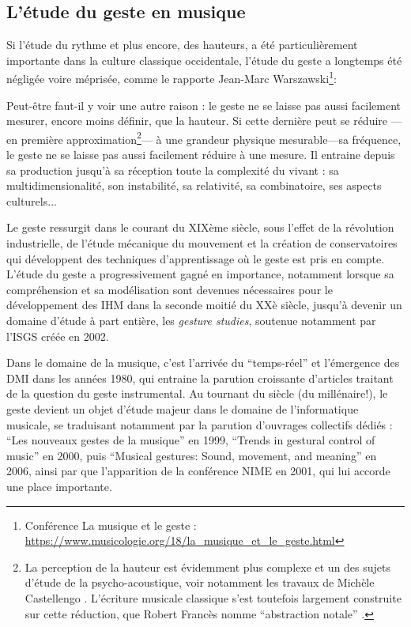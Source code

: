 \subsection{L'étude du geste en musique}

\noindent Si l'étude du rythme et plus encore, des hauteurs, a été particulièrement importante dans la culture classique occidentale, l'étude du geste a longtemps été négligée voire méprisée, comme le rapporte Jean-Marc Warszawski\footnote{Conférence La musique et le geste : \url{https://www.musicologie.org/18/la_musique_et_le_geste.html}}:


Peut-être faut-il y voir une autre raison : le geste ne se laisse pas aussi facilement mesurer, encore moins définir, que la hauteur. Si cette dernière peut se  réduire —en première approximation\footnote{La perception de la hauteur est évidemment plus complexe et un des sujets d'étude de la psycho-acoustique, voir notamment les travaux de Michèle Castellengo \cite{castellengo_ecoute_2015}. L'écriture musicale classique s'est toutefois largement construite sur cette réduction, que Robert Francès nomme ``abstraction notale'' \cite{frances_perception_1984}.}— à une grandeur physique mesurable—sa fréquence, le geste ne se laisse pas aussi facilement réduire à une mesure. Il entraine depuis sa production jusqu'à sa réception toute la complexité du vivant : sa multidimensionalité, son instabilité, sa relativité, sa combinatoire, ses aspects culturels...

Le geste ressurgit dans le courant du XIXème siècle, sous l'effet de la révolution industrielle, de l'étude mécanique du mouvement et la création de conservatoires qui développent des techniques d'apprentissage où le geste est pris en compte. L'étude du geste a progressivement gagné en importance, notamment lorsque sa compréhension et sa modélisation sont devenues nécessaires pour le développement des \gls{IHM} dans la seconde moitié du XXè siècle, jusqu'à devenir un domaine d'étude à part entière, les \textit{gesture studies}, soutenue notamment par l'\gls{ISGS} créée en 2002.

Dans le domaine de la musique, c'est l'arrivée du ``temps-réel'' et l'émergence des DMI dans les années 1980, qui entraine la parution croissante d'articles traitant de la question du geste instrumental. Au tournant du siècle (du millénaire!), le geste devient un objet d'étude majeur dans le domaine de l'informatique musicale, se traduisant notamment par la parution d'ouvrages collectifs dédiés : ``Les nouveaux gestes de la musique'' \cite{genevois_les_1999} en 1999, ``Trends in gestural control of music'' \cite{wanderley_trends_2000} en 2000, puis ``Musical gestures: Sound, movement, and meaning'' \cite{godoy_musical_2010} en 2006, ainsi par que l'apparition de la conférence \gls{NIME} en 2001, qui lui accorde une place importante.


